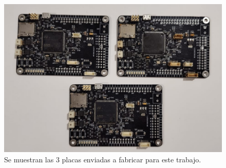 \begin{figure}[htb]
    \centering
    \includegraphics[width=\textwidth]{img/choris_4.png}
    \caption{Se muestran las 3 placas enviadas a fabricar para este trabajo.}
    \label{fig:choris_4}
\end{figure}




